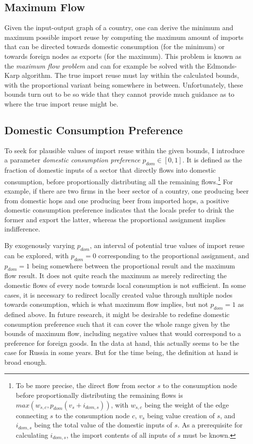 \documentclass{paper}
\begin{document}
\subsection{Maximum Flow}
Given the input-output graph of a country, one can derive the minimum and maximum possible import reuse by computing the maximum amount of imports that can be directed towards domestic consumption (for the minimum) or towards foreign nodes as exports (for the maximum). This problem is known as the \emph{maximum flow problem} and can for example be solved with the Edmonds-Karp algorithm. \cite{edmonds1972theoretical} The true import reuse must lay within the calculated bounds, with the proportional variant being somewhere in between. Unfortunately, these bounds turn out to be so wide that they cannot provide much guidance as to where the true import reuse might be.

\subsection{Domestic Consumption Preference}
To seek for plausible values of import reuse within the given bounds, I introduce a parameter \emph{domestic consumption preference} $p_{dom} \in [0,1]$. It is defined as the fraction of domestic inputs of a sector that directly flows into domestic consumption, before proportionally distributing all the remaining flows.\footnote{To be more precise, the direct flow from sector $s$ to the consumption node before proportionally distributing the remaining flows is $max(w_{s,c}, p_{dom} (v_s + i_{dom,s}))$, with $w_{s,c}$ being the weight of the edge connecting $s$ to the consumption node $c$, $v_s$ being value creation of $s$, and $i_{dom,s}$ being the total value of the domestic inputs of $s$. As a prerequisite for calculating $i_{dom,s}$, the import contents of all inputs of $s$ must be known.} For example, if there are two firms in the beer sector of a country, one producing beer from domestic hops and one producing beer from imported hops, a positive domestic consumption preference indicates that the locals prefer to drink the former and export the latter, whereas the proportional assignment implies indifference.

By exogenously varying $p_{dom}$, an interval of potential true values of import reuse can be explored, with $p_{dom}=0$ corresponding to the proportional assignment, and $p_{dom}=1$ being somewhere between the proportional result and the maximum flow result. It does not quite reach the maximum as merely redirecting the domestic flows of every node towards local consumption is not sufficient. In some cases, it is necessary to redirect locally created value through multiple nodes towards consumption, which is what maximum flow implies, but not $p_{dom}=1$ as defined above. In future research, it might be desirable to redefine domestic consumption preference such that it can cover the whole range given by the bounds of maximum flow, including negative values that would correspond to a preference for foreign goods. In the data at hand, this actually seems to be the case for Russia in some years. But for the time being, the definition at hand is broad enough.
\end{document}
